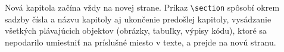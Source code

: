 \documentclass[../../../thesis.tex]{subfiles}
\begin{document}
Nová kapitola začína vždy na novej strane.
Príkaz \verb|\section| spôsobí okrem sadzby čísla a názvu kapitoly aj ukončenie predošlej kapitoly, vysádzanie všetkých plávajúcich objektov (obrázky, tabuľky, výpisy kódu), ktoré sa nepodarilo umiestniť na príslušné miesto v texte, a prejde na novú stranu.
\end{document}
